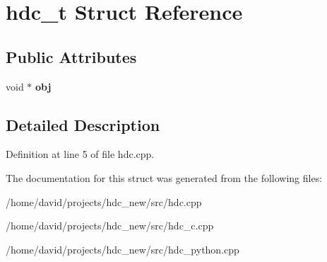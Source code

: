 \hypertarget{a00007}{}\section{hdc\+\_\+t Struct Reference}
\label{a00007}
\subsection*{Public Attributes}
\begin{DoxyCompactItemize}
\item 
void $\ast$ {\bfseries obj}\hypertarget{a00007_af998aa25515681a151a201355fc9e108}{}\label{a00007_af998aa25515681a151a201355fc9e108}

\end{DoxyCompactItemize}


\subsection{Detailed Description}


Definition at line 5 of file hdc.\+cpp.



The documentation for this struct was generated from the following files\+:\begin{DoxyCompactItemize}
\item 
/home/david/projects/hdc\+\_\+new/src/hdc.\+cpp\item 
/home/david/projects/hdc\+\_\+new/src/hdc\+\_\+c.\+cpp\item 
/home/david/projects/hdc\+\_\+new/src/hdc\+\_\+python.\+cpp\end{DoxyCompactItemize}
